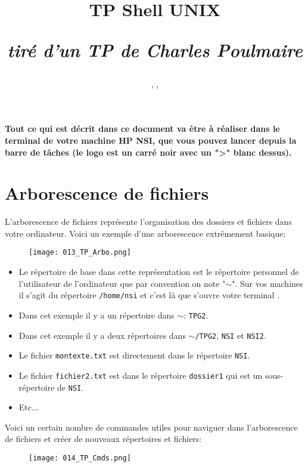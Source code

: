 \documentclass[12pt]{article}
\title
	{\vspace{2cm}
		{\Large
		\textit
			{
				\classe\hspace{0.1cm}
				\textemdash\
				\hspace{0.1cm}
				\themecours
			}
			
		\vspace{1cm}
		\huge{TP Shell UNIX}
		
		\large{\textit{tiré d'un TP de Charles Poulmaire}}
		
}
		 
		\vspace{1cm}
	}
\author{\etablissement}
\date{
	\auteur,
	\datedoc,
	\footnotesize{\textit{\versiondoc}} 
	\vspace{3cm}
	}
\begin{document}
	
	\maketitle
	\thispagestyle{empty}
	\vspace{\baselineskip}
	
	\pagebreak
	
	
	\textbf{Tout ce qui est décrit dans ce document va être à réaliser dans le terminal de votre machine HP NSI, que vous pouvez lancer depuis la barre de tâches (le logo est un carré noir avec un ">" blanc dessus).}
	
	\section{Arborescence de fichiers}
	
	L'arborescence de fichiers représente l'organisation des dossiers et fichiers dans votre ordinateur. Voici un exemple d’une arborescence extrêmement basique:
	
	\begin{figure}[H]
		\centering
		\texttt{[image: 013\_TP\_Arbo.png]}
	\end{figure}
	
	\begin{itemize}
		\item Le répertoire de base dans cette représentation est le répertoire personnel de l'utilisateur de l'ordinateur que par convention on note "$\sim$". Sur vos machines il s'agit du répertoire \texttt{/home/nsi} et c'est là que s'ouvre votre terminal .
		\item Dans cet exemple il y a un répertoire dans $\sim$: \texttt{TPG2}.
		\item Dans cet exemple il y a deux répertoires dans $\sim$\texttt{/TPG2}, \texttt{NSI} et \texttt{NSI2}.
		\item Le fichier \texttt{montexte.txt} est directement dans le répertoire \texttt{NSI}.
		\item Le fichier \texttt{fichier2.txt} est dans le répertoire \texttt{dossier1} qui est un sous-répertoire de \texttt{NSI}.
		\item Etc...
	\end{itemize}
	
	Voici un certain nombre de commandes utiles pour naviguer dans l'arborescence de fichiers et créer de nouveaux répertoires et fichiers:
	
	\begin{figure}[H]
		\centering
		\texttt{[image: 014\_TP\_Cmds.png]}
	\end{figure}
	
\end{document}
